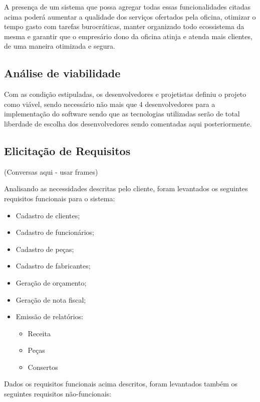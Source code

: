 \documentclass[a4paper,10pt]{article}
\begin{document}
A presença de um sistema que possa agregar todas essas funcionalidades citadas acima poderá aumentar a qualidade dos serviços ofertados pela oficina, otimizar o tempo gasto com tarefas burocráticas, manter organizado todo ecossistema da mesma e garantir que o empresário dono da oficina atinja e atenda mais clientes, de uma maneira otimizada e segura. 

\subsection{Análise de viabilidade}

Com as condição estipuladas, os desenvolvedores e projetistas definiu o projeto como viável, sendo necessário não mais que 4 desenvolvedores para a implementação do software sendo que as tecnologias utilizadas serão de total liberdade de escolha dos desenvolvedores sendo comentadas aqui posteriormente.

\subsection{Elicitação de Requisitos}

(Conversas aqui - usar frames)

Analisando as necessidades descritas pelo cliente, foram levantados os seguintes requisitos funcionais para o sistema:

\begin{itemize}
\item Cadastro de clientes;
\item Cadastro de funcionários;
\item Cadastro de peças;
\item Cadastro de fabricantes;
\item Geração de orçamento;
\item Geração de nota fiscal;
\item Emissão de relatórios:
  \begin{itemize}
	\item Receita
	\item Peças
	\item Consertos
  \end{itemize}
  
\end{itemize}

Dados os requisitos funcionais acima descritos, foram levantados também os seguintes requisitos não-funcionais:
\end{document}
